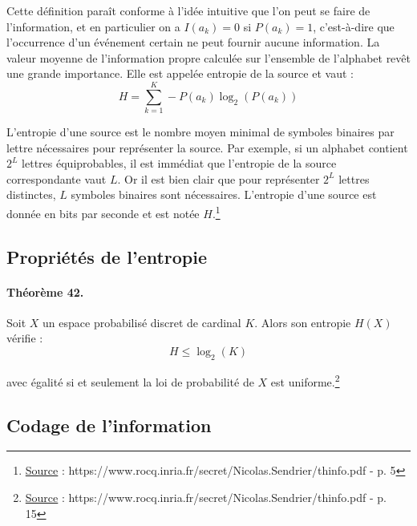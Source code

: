\documentclass{article}
\newcommand{\plagiat}[1]{\footnote{\underline{Source} : https://www.rocq.inria.fr/secret/Nicolas.Sendrier/thinfo.pdf - p. #1}}
\begin{document}
{    Cette définition paraît conforme à l'idée intuitive que l'on peut se faire de l'information, et en particulier on a $I(a_k) = 0$ si $P(a_k) = 1$, c'est-à-dire que l'occurrence d'un événement certain ne peut fournir aucune information. La valeur moyenne de l'information propre calculée sur l'ensemble de l'alphabet revêt une grande importance. Elle est appelée entropie de la source et vaut : 
    \[H = \sum^K_{k=1} -P(a_k)\log_2(P(a_k))\]

    L'entropie d'une source est le nombre moyen minimal de symboles binaires par lettre nécessaires pour représenter la source. Par exemple, si un alphabet contient $2^L$ lettres équiprobables, il est immédiat que l'entropie de la source correspondante vaut $L$. Or il est bien clair que pour représenter $2^L$ lettres distinctes, $L$ symboles binaires sont nécessaires. L'entropie d'une source est donnée en bits par seconde et est notée $H$.\plagiat{5}

    \subsection{Propriétés de l'entropie}

    \paragraph{Théorème 42.}

    Soit $X$ un espace probabilisé discret de cardinal $K$. Alors son entropie $H(X)$ vérifie :
    \[H \le \log_2(K)\]}
    avec égalité si et seulement la loi de probabilité de $X$ est uniforme.\plagiat{15}

    \subsection{Codage de l'information}
\end{document}

